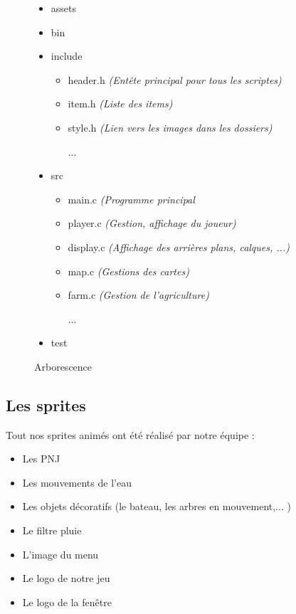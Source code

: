 \documentclass{article}
\begin{document}
\begin{figure}[h]  
    \begin{itemize}
        \item assets
        \item bin
        \item include
        \begin{itemize}
            \item header.h \textit{(Entête principal pour tous les scriptes)}
            \item item.h \textit{(Liste des items)}
            \item style.h \textit{(Lien vers les images dans les dossiers)}
            \item [...]
        \end{itemize}
        \item src
        \begin{itemize}
            \item main.c \textit{(Programme principal}
            \item player.c  \textit{(Gestion, affichage du joueur)}
            \item display.c \textit{(Affichage des arrières plans, calques, ...)}
            \item map.c \textit{(Gestions des cartes)}
            \item farm.c \textit{(Gestion de l'agriculture)}
            \item [...]
        \end{itemize}
        \item test
    \end{itemize}
    \centering
    \caption{Arborescence}
    \label{fig:arborescence}
\end{figure}


\subsection{Les sprites}
Tout nos sprites animés ont été réalisé par notre équipe : 
\begin{itemize}
    \item Les PNJ
    \item Les mouvements de l'eau
    \item Les objets décoratifs (le bateau, les arbres en mouvement,... )
    \item Le filtre pluie
    \item L'image du menu
    \item Le logo de notre jeu
    \item Le logo de la fenêtre
\end{itemize}
\end{document}
